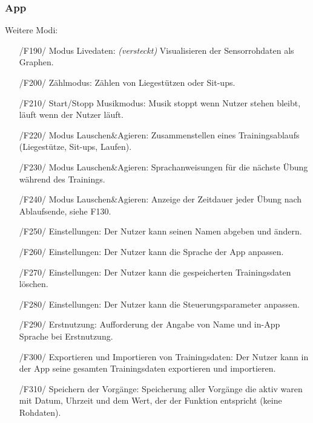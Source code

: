 \documentclass[a4paper,12pt]{article}
\begin{document}
\begin{itemize}
    \subsubsection{App}
      Weitere Modi:
      \begin{itemize}
      \item[/F190/] \textsf{Modus Livedaten: \textit{(versteckt)}} Visualisieren der Sensorrohdaten als Graphen.    
      \item[/F200/] \textsf{Zählmodus:} Zählen von Liegestützen oder Sit-ups. %
      \item[/F210/] \textsf{Start/Stopp Musikmodus:} Musik stoppt wenn Nutzer stehen bleibt, läuft wenn der Nutzer läuft.
      \item[/F220/] \textsf{Modus Lauschen\&Agieren:} Zusammenstellen eines Trainingsablaufs (Liegestütze, Sit-ups, Laufen). 
      \item[/F230/] \textsf {Modus Lauschen\&Agieren:} Sprachanweisungen für die nächste Übung während des Trainings.
      \item[/F240/] \textsf {Modus Lauschen\&Agieren:} Anzeige der Zeitdauer jeder Übung nach Ablaufsende, siehe F130.
      \item[/F250/] \textsf {Einstellungen:} Der Nutzer kann seinen Namen abgeben und ändern.
      \item[/F260/] \textsf {Einstellungen:} Der Nutzer kann die Sprache der App anpassen.
      \item[/F270/] \textsf {Einstellungen:} Der Nutzer kann die gespeicherten Trainingsdaten löschen.
      \item[/F280/] \textsf {Einstellungen:} Der Nutzer kann die Steuerungsparameter anpassen. %
      \item[/F290/] \textsf {Erstnutzung:} Aufforderung der Angabe von Name und in-App Sprache bei Erstnutzung.
      \item[/F300/] \textsf{Exportieren und Importieren von Trainingsdaten:} Der Nutzer kann in der App seine gesamten Trainingsdaten exportieren und importieren.
      \item[/F310/] \textsf{Speichern der Vorgänge:} Speicherung aller Vorgänge die aktiv waren mit Datum, Uhrzeit und dem Wert, der der Funktion entspricht (keine Rohdaten).   %
      \end{itemize}



\end{itemize}
\end{document}
